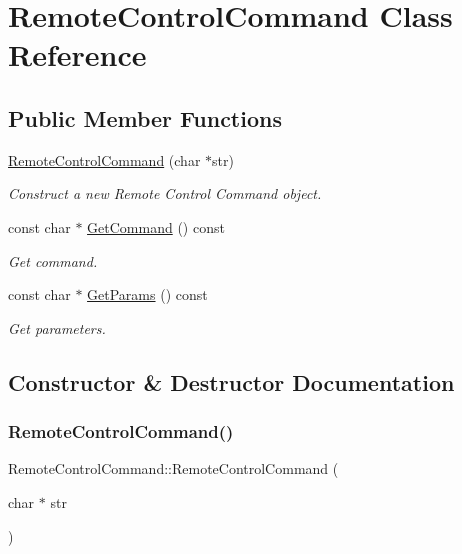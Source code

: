 \hypertarget{classRemoteControlCommand}{}\section{Remote\+Control\+Command Class Reference}
\label{classRemoteControlCommand}
\subsection*{Public Member Functions}
\begin{DoxyCompactItemize}
\item 
\mbox{\hyperlink{classRemoteControlCommand_adb1a84e968947f9d821d5ad9296f636f}{Remote\+Control\+Command}} (char $\ast$str)
\begin{DoxyCompactList}\small\item\em Construct a new Remote Control Command object. \end{DoxyCompactList}\item 
const char $\ast$ \mbox{\hyperlink{classRemoteControlCommand_a3ef6fc2ec020b5b1c7b7a9188a0848d8}{Get\+Command}} () const
\begin{DoxyCompactList}\small\item\em Get command. \end{DoxyCompactList}\item 
const char $\ast$ \mbox{\hyperlink{classRemoteControlCommand_a292b01c818d36dd6f1e8b8f1b3dc58ae}{Get\+Params}} () const
\begin{DoxyCompactList}\small\item\em Get parameters. \end{DoxyCompactList}\end{DoxyCompactItemize}


\subsection{Constructor \& Destructor Documentation}
\mbox{\label{classRemoteControlCommand_adb1a84e968947f9d821d5ad9296f636f}} 
\subsubsection{\texorpdfstring{RemoteControlCommand()}{RemoteControlCommand()}}
{\footnotesize\ttfamily Remote\+Control\+Command\+::\+Remote\+Control\+Command (\begin{DoxyParamCaption}\item[{char $\ast$}]{str }\end{DoxyParamCaption})}



